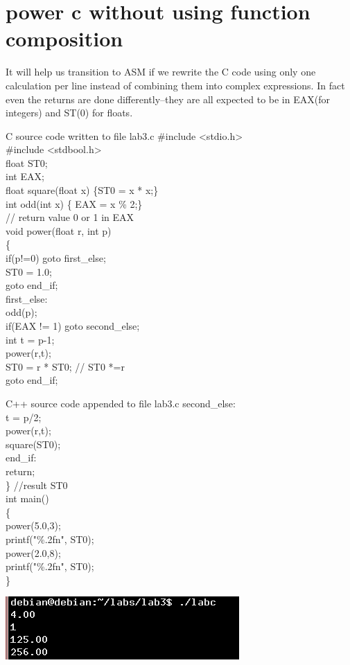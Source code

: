 \documentclass{article}
\begin{document}
\clearpage\section{power c without using function composition}
It will help us transition to ASM if we rewrite the C code using only one calculation per line instead of combining them into complex expressions.
In fact even the returns are done differently--they are all expected to be in EAX(for integers) and ST(0) for floats.
\begin{multicols}{2}
\begin{GFT}{C source code written to file lab3.c}
\+\#include <stdio.h>\\
\+\#include <stdbool.h>\\
\+float ST0;\\
\+int EAX;\\
\+float square(float x) \{ST0 = x * x;\}\\
\+int odd(int x) \{ EAX = x \% 2;\} \\
\+// return value 0 or 1 in EAX\\
\+void power(float r, int p)\\
\+\{\\
\+  if(p!=0) goto first\_else;\\
\+  ST0 = 1.0;\\
\+  goto end\_if;\\
\+first\_else:\\
\+  odd(p);\\
\+  if(EAX != 1) goto second\_else;\\
\+  int t = p-1;\\
\+  power(r,t);\\
\+  ST0 = r * ST0; // ST0 *=r\\
\+  goto end\_if;\\
\end{GFT}
\columnbreak
\begin{GFT}{C++ source code appended to file lab3.c}
\+second\_else:\\
\+  t = p/2;\\
\+  power(r,t);\\
\+  square(ST0);\\
\+end\_if:\\
\+  return;\\
\+\} //result ST0\\
\+int main()\\
\+\{\\
\+  power(5.0,3);\\
\+  printf("\%.2f\Backslash{}n", ST0);\\
\+  power(2.0,8);\\
\+  printf("\%.2f\Backslash{}n", ST0);\\
\+\}\\
\end{GFT}
\includegraphics[scale=0.8]{lab3c.png}
\end{multicols}
\end{document}
